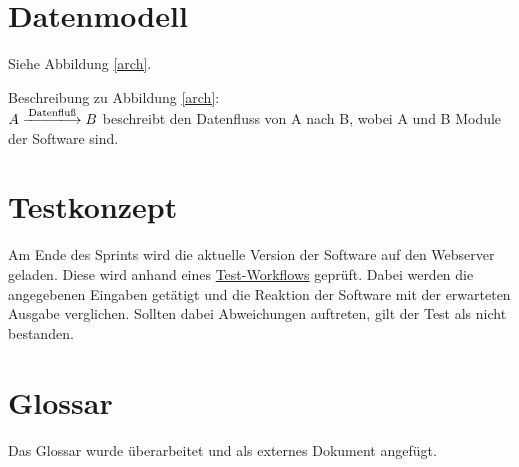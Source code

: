 \documentclass[11pt,a4paper]{article}
\begin{document}
\section{Datenmodell}

Siehe Abbildung \ref{arch}.\bigskip

Beschreibung zu Abbildung \ref{arch}: \\
$A \xlongrightarrow{\text{Datenfluß}} B $ beschreibt den Datenfluss von A nach B, wobei A und B Module der Software sind.


\section{Testkonzept}
Am Ende des Sprints wird die aktuelle Version der Software auf den Webserver geladen. Diese wird anhand eines \href{https://github.com/GKP15/pucman/wiki/Test-workflow}{Test-Workflows} geprüft. Dabei werden die angegebenen Eingaben getätigt und die Reaktion der Software mit der erwarteten Ausgabe verglichen. Sollten dabei Abweichungen auftreten, gilt der Test als nicht bestanden.

\section{Glossar}
Das Glossar wurde überarbeitet und als externes Dokument angefügt.
\end{document}

